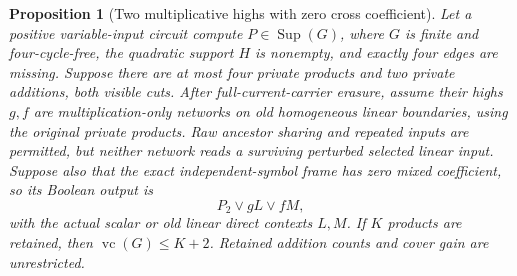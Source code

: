 \documentclass[11pt]{article}
\newcommand{\Sup}{\operatorname{Sup}}
\newcommand{\vc}{\operatorname{vc}}
\newtheorem{proposition}[theorem]{Proposition}
\theoremstyle{definition}
\theoremstyle{remark}
\begin{document}
\begin{proposition}[Two multiplicative highs with zero cross coefficient]
\label{prop:unaffectedzerocross}
Let a positive variable-input circuit compute $P\in\Sup(G)$, where $G$
is finite and four-cycle-free, the quadratic support $H$ is nonempty,
and exactly four edges are missing. Suppose there are at most four
private products and two private additions, both visible cuts.
After full-current-carrier erasure, assume their highs $g,f$ are
multiplication-only networks on old homogeneous linear boundaries, using
the original private products. Raw ancestor sharing and repeated inputs
are permitted, but neither network reads a surviving perturbed selected
linear input. Suppose also that the exact independent-symbol frame has
zero mixed coefficient, so its Boolean output is
\[
 P_2\vee gL\vee fM,
\]
with the actual scalar or old linear direct contexts $L,M$.
If $K$ products are retained, then $\vc(G)\le K+2$.
Retained addition counts and cover gain are unrestricted.
\end{proposition}
\end{document}
